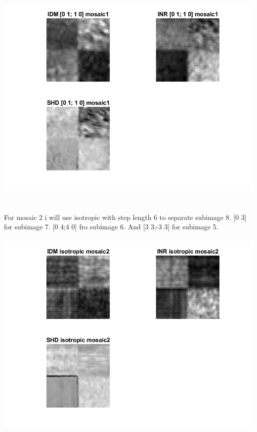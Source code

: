 \documentclass[12pt, letterpaper, twoside]{article}
\begin{document}
\includegraphics[scale=1]{"m1[01;10].png"}\\
\ \\
\newpage
\ \\
For mosaic 2 i will use isotropic with step length 6 to separate subimage 8. [0 3] for subimage 7. [0 4;4 0] fro subimage 6. And [3 3;-3 3] for subimage 5.\\
\ \\
\includegraphics[scale=1]{"m2[isotropic].png"}\\
\ \\
\end{document}
